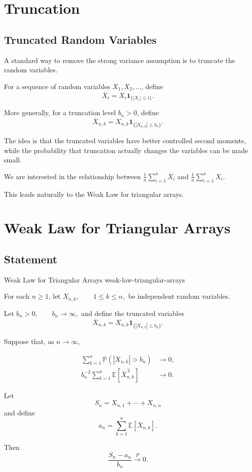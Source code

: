 \section{Truncation}

\subsection{Truncated Random Variables}

A standard way to remove the strong variance assumption is to
truncate the random variables.

For a sequence of random variables $X_1,X_2,\ldots$, define
\[
\overline{X}_i
=
X_i\mathbf{1}_{\{|X_i|\leq i\}}.
\]

More generally, for a truncation level $b_n>0$, define
\[
\overline{X}_{n,k}
=
X_{n,k}
\mathbf{1}_{\{|X_{n,k}|\leq b_n\}}.
\]

The idea is that the truncated variables have better controlled
second moments, while the probability that truncation actually
changes the variables can be made small.

We are interested in the relationship between
\(
\frac1n\sum_{i=1}^n\overline{X}_i
\)
and
\(
\frac1n\sum_{i=1}^nX_i.
\)

This leads naturally to the Weak Law for triangular arrays.



\section{Weak Law for Triangular Arrays}

\subsection{Statement}

\begin{theorem}{Weak Law for Triangular Arrays}
{weak-law-triangular-arrays}

For each $n\geq1$, let
\(
X_{n,k},
\qquad
1\leq k\leq n,
\)
be independent random variables.

Let
\(
b_n>0,
\qquad
b_n\longrightarrow\infty,
\)
and define the truncated variables
\[
\overline{X}_{n,k}
=
X_{n,k}
\mathbf{1}_{\{|X_{n,k}|\leq b_n\}}.
\]

Suppose that, as $n\to\infty$,

\begin{align}
\sum_{k=1}^n
\mathbb{P}(|X_{n,k}|>b_n)
&\longrightarrow0,
\tag{i}
\\
b_n^{-2}
\sum_{k=1}^n
\mathbb{E}\left[\overline{X}_{n,k}^{\,2}\right]
&\longrightarrow0.
\tag{ii}
\end{align}

Let
\[
S_n
=
X_{n,1}+\cdots+X_{n,n}
\]
and define
\[
a_n
=
\sum_{k=1}^n
\mathbb{E}\left[\overline{X}_{n,k}\right].
\]

Then
\[
\boxed{
\frac{S_n-a_n}{b_n}
\xrightarrow{P}0.
}
\]

\end{theorem}



